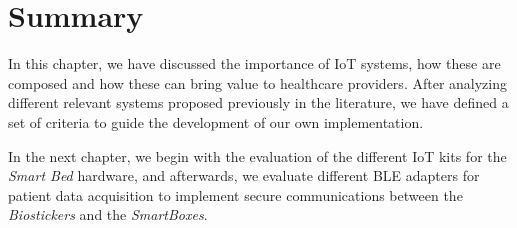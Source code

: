 \section{Summary}
In this chapter, we have discussed the importance of \acs{IoT} systems, how these are composed and how these can bring value to healthcare providers. After analyzing different relevant systems proposed previously in the literature, we have defined a set of criteria to guide the development of our own implementation.

\bigskip

In the next chapter, we begin with the evaluation of the different \acs{IoT} kits for the \textit{Smart Bed} hardware, and afterwards, we evaluate different \acs{BLE} adapters for patient data acquisition to implement secure communications between the \textit{Biostickers} and the \textit{SmartBoxes}. 




\bigskip